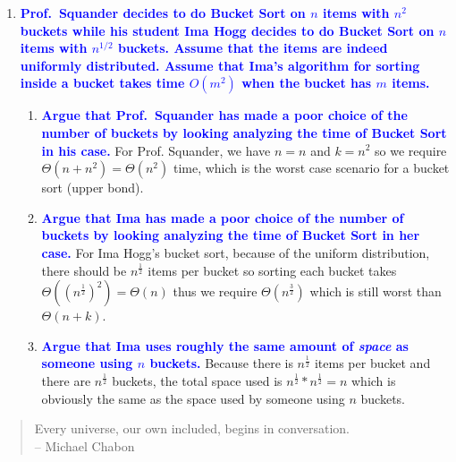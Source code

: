 \documentclass{article}
\begin{document}
\begin{enumerate}
\item \textbf{\textcolor{blue}{Prof.\ Squander decides to do Bucket Sort on $n$ items with $n^2$ buckets while
his student Ima Hogg decides to do Bucket Sort on $n$ items with $n^{1/2}$ buckets.
Assume that the items are indeed uniformly distributed.  Assume that Ima's algorithm
for sorting inside a bucket takes time $O(m^2)$ when the bucket has $m$ items.}}
    \begin{enumerate}
    \item \textbf{\textcolor{blue}{Argue that Prof.\ Squander has made a poor choice of the number of buckets by
    looking analyzing the time of Bucket Sort in his case.}}
        \newline\newline For Prof. Squander, we have $n=n$ and $k=n^2$ so we require $\Theta(n + n^2)=\Theta(n^2)$ time, which is the worst case scenario for a bucket sort (upper bond).
    \item \textbf{\textcolor{blue}{Argue that Ima has made a poor choice of the number of buckets by looking analyzing the time of Bucket Sort in her case.}}
        \newline\newline For Ima Hogg's bucket sort, because of the uniform distribution, there should be $n^\frac{1}{2}$ items per bucket so sorting each bucket takes $\Theta((n^\frac{1}{2})^2)=\Theta(n)$ thus we require $\Theta(n^\frac{3}{2})$ which is still worst than $\Theta(n + k)$.
    \item \textbf{\textcolor{blue}{Argue that Ima uses roughly the same amount of {\em space} as someone
    using $n$ buckets.}}
        \newline\newline Because there is $n^\frac{1}{2}$ items per bucket and there are $n^\frac{1}{2}$ buckets, the total space used is $n^\frac{1}{2}*n^\frac{1}{2}=n$ which is obviously the same as the space used by someone using $n$ buckets.
    \end{enumerate}
\end{enumerate}

\begin{quote}
Every universe, our own included, begins in conversation.
\\ -- Michael Chabon
\end{quote}
\end{document}
